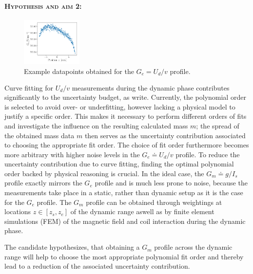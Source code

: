 \documentclass{article}
\begin{document}
\paragraph*{\normalfont \textsc{Hypothesis and aim 2:}}
\begin{figure}
	\centering
	\includegraphics[width=0.27\textwidth]{figures/Ge_example.pdf}
	\caption{Example datapoints obtained for the $G_e = U_d/v$ profile.}
	\label{fig:U_d_over_v_profile}
\end{figure}
Curve fitting for $U_d/v$ measurements during the dynamic phase contributes significantly to the uncertainty budget, as \cite{Eichenberger_2022} write. Currently, the polynomial order is selected to avoid over- or underfitting, however lacking a physical model to justify a specific order.
This makes it necessary to perform different orders of fits and investigate the influence on the resulting calculated mass $m$; the spread of the obtained mass data $m$ then serves as the uncertainty contribution associated to choosing the appropriate fit order. The choice of fit order furthermore becomes more arbitrary with higher noise levels in the $G_e \doteq U_d/v$ profile. To reduce the uncertainty contribution due to curve fitting, finding the optimal polynomial order backed by physical reasoning is crucial. In the ideal case, the $G_m \doteq g/I_s$ profile exactly mirrors the $G_e$ profile and is much less prone to noise, because the measurements take place in a static, rather than dynamic setup as it is the case for the $G_e$ profile. The $G_m$ profile can be obtained through weightings at locations $z \in [z_s, z_e]$ of the dynamic range aswell as by finite element simulations (FEM) of the magnetic field and coil interaction during the dynamic phase.

The candidate hypothesizes, that obtaining a $G_m$ profile across the dynamic range will help to choose the most appropriate polynomial fit order and thereby lead to a reduction of the associated uncertainty contribution.
\end{document}
